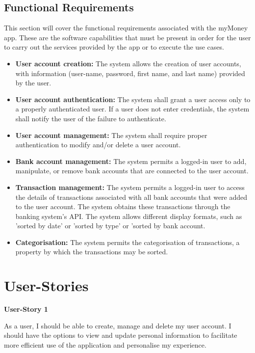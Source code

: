 \documentclass[11pt]{article}
\newcounter{use case ID}
\newcounter{req ID}
\begin{document}
\subsection{Functional Requirements} \label{func req}

This section will cover the functional requirements associated with the myMoney app. These are the software capabilities that must be present in order for the user to carry out the services provided by the app or to execute the use cases.

\begin{itemize}
    \item  \textbf{User account creation:} The system allows the creation of user accounts, with information (user-name, password, first name, and last name) provided by the user.
    \item \textbf{User account authentication:} The system shall grant a user access only to a properly authenticated user. If a user does not enter credentials, the system shall notify the user of the failure to authenticate.
    \item \textbf{User account management:} The system shall require proper authentication to modify and/or delete a user account.
    \item  \textbf{Bank account management:} The system permits a logged-in user to add, manipulate, or remove bank accounts that are connected to the user account.
    \item  \textbf{Transaction management:} The system permits a logged-in user to access the details of transactions associated with all bank accounts that were added to the user account. The system obtains these transactions through the banking system's API. The system allows different display formats, such as 'sorted by date' or 'sorted by type' or 'sorted by bank account.
    \item \textbf{Categorisation:} The system permits the categorisation of transactions, a property by which the transactions may be sorted.
\end{itemize}

\section{User-Stories}

\textbf{User-Story 1}

As a user, I should be able to create, manage and delete my user account. I should have the options to view and update personal information to facilitate more efficient use of the application and personalise my experience.
\end{document}
